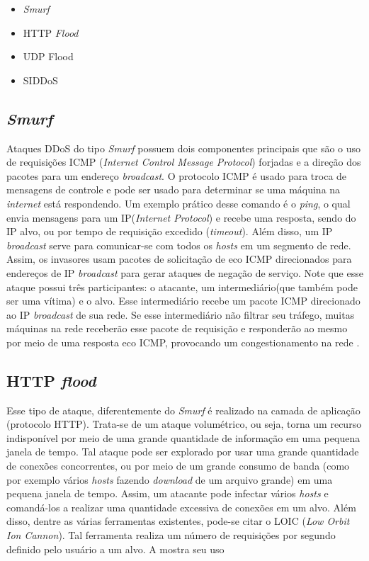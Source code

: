 \begin{itemize}
	 \item \textit{Smurf}
	 \item HTTP \textit{Flood}
	 \item UDP Flood
	 \item SIDDoS
\end{itemize}

\subsection{\textit{Smurf}}
Ataques DDoS do tipo \textit{Smurf} possuem dois componentes principais que são o uso de requisições ICMP (\textit{Internet Control Message Protocol}) forjadas e a direção dos pacotes para um endereço \textit{broadcast}. O protocolo ICMP  é usado para troca de mensagens de controle e pode ser usado para determinar se uma máquina na \textit{internet} está respondendo. Um exemplo prático desse comando é o \textit{ping}, o qual envia mensagens para um IP(\textit{Internet Protocol}) e recebe uma resposta, sendo do IP alvo, ou por tempo de requisição excedido (\textit{timeout}). Além disso, um IP \textit{broadcast} serve para comunicar-se com todos os \textit{hosts} em um segmento de rede. Assim, os invasores usam pacotes de solicitação de eco ICMP direcionados para endereços de IP \textit{broadcast} para gerar ataques de negação de serviço. Note que esse ataque possui três participantes: o atacante, um intermediário(que também pode ser uma vítima) e o alvo. Esse intermediário recebe um pacote ICMP direcionado ao IP \textit{broadcast} de sua rede. Se esse intermediário não filtrar seu tráfego, muitas máquinas na rede receberão esse pacote de requisição e responderão ao mesmo por meio de uma resposta eco ICMP, provocando um congestionamento na rede \cite{certSmurf}.
\subsection{HTTP \textit{flood}}
Esse tipo de ataque, diferentemente do \textit{Smurf} é realizado na camada de aplicação (protocolo HTTP). Trata-se de um ataque volumétrico, ou seja, torna um recurso indisponível por meio de uma grande quantidade de informação em uma pequena janela de tempo. Tal ataque pode ser explorado por  usar uma grande quantidade de conexões concorrentes, ou por meio de um grande consumo de banda (como por exemplo vários \textit{hosts} fazendo \textit{download} de um arquivo grande) em uma pequena janela de tempo. Assim, um atacante pode infectar vários \textit{hosts} e comandá-los a realizar uma quantidade excessiva de conexões em um alvo. Além disso, dentre as várias ferramentas existentes, pode-se citar o LOIC (\textit{Low Orbit Ion Cannon}). Tal ferramenta realiza um número de requisições por segundo definido pelo usuário a um alvo. A  mostra seu uso 
 
